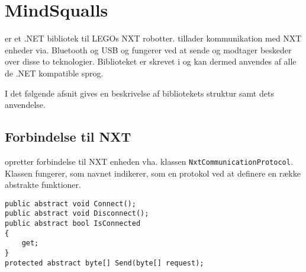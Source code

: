 \section{MindSqualls}
\mindsqualls er et .NET bibliotek til LEGOs NXT robotter.
\mindsqualls tillader kommunikation med NXT enheder via. Bluetooth og USB og fungerer ved at sende og modtager beskeder over disse to teknologier.
Biblioteket er skrevet i \csharp og kan dermed anvendes af alle de .NET kompatible sprog.

I det følgende afsnit gives en beskrivelse af bibliotekets struktur samt dets anvendelse.

\subsection{Forbindelse til NXT}
\mindsqualls opretter forbindelse til NXT enheden vha. klassen \lstinline[style=csharp]!NxtCommunicationProtocol!.
Klassen fungerer, som navnet indikerer, som en protokol ved at definere en række abstrakte funktioner.
\begin{lstlisting}[style=csharp]
public abstract void Connect();
public abstract void Disconnect();
public abstract bool IsConnected
{
    get;
}
protected abstract byte[] Send(byte[] request);
\end{lstlisting}
